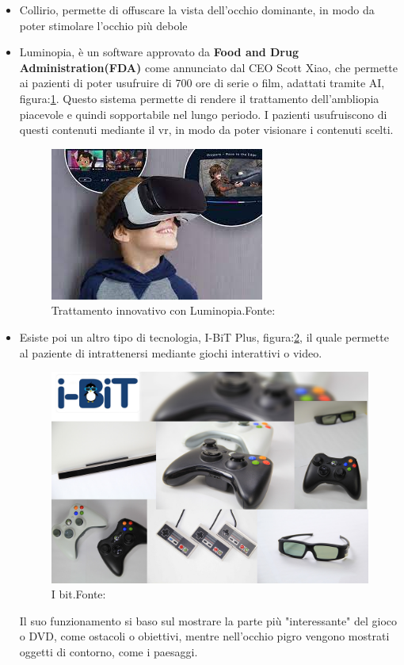 \documentclass[
a4paper,
cleardoublepage=empty,
headings=twolinechapter,
numbers=autoenddot,
]{scrbook}
\begin{document}
\begin{itemize}
		\item Collirio, permette di offuscare la vista dell'occhio dominante, in modo da poter stimolare l'occhio più debole
		
		\item Luminopia, è un software approvato da \textbf{Food and Drug Administration(FDA)}\cite{Approvazione_luminopia} come annunciato dal CEO Scott Xiao, che permette ai pazienti di poter usufruire di 700 ore di serie o film, adattati tramite AI, figura:\ref{fig:luminopia}. Questo sistema permette di rendere il trattamento dell'ambliopia piacevole e quindi sopportabile nel lungo periodo.
		I pazienti usufruiscono di questi contenuti mediante il vr, in modo da poter visionare i contenuti scelti.
			\begin{figure}[H]
				\centering
				\includegraphics[width=0.5\linewidth]{image/luminopia}
				\caption{Trattamento innovativo con Luminopia.Fonte:\cite{Lumiopia_image}}
				\label{fig:luminopia}
			\end{figure}
	    \item Esiste poi un altro tipo di tecnologia, I-BiT Plus\cite{I-Bit}, figura:\ref{fig:I_bit}, il quale permette al paziente di intrattenersi mediante giochi interattivi o video.
		    \begin{figure}[H]
		    	\centering
		    	\includegraphics[width=0.5\linewidth]{image/I_bit}
		    	\caption{I bit.Fonte:\cite{I-Bit}}
		    	\label{fig:I_bit}
		    \end{figure}
	    Il suo funzionamento si baso sul mostrare la parte più "interessante" del gioco o DVD, come ostacoli o obiettivi, mentre nell'occhio pigro vengono mostrati oggetti di contorno, come i paesaggi.

\end{itemize}
\end{document}
